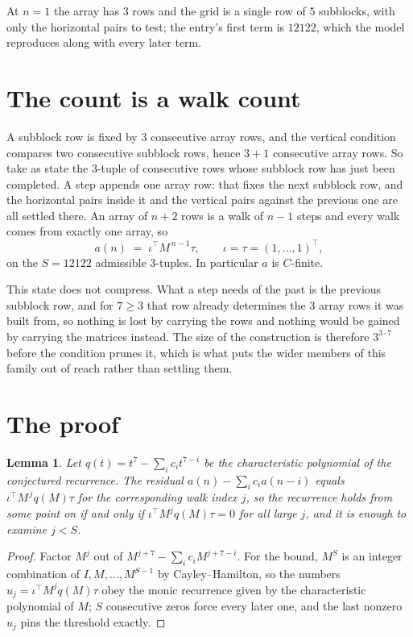 \documentclass[11pt,a4paper]{article}
\theoremstyle{plain}
\newtheorem{lemma}[theorem]{Lemma}
\theoremstyle{definition}
\begin{document}
At $n=1$ the array has $3$ rows and the grid is a single row of $5$
subblocks, with only the horizontal pairs to test; the entry's first term is
$12122$, which the model reproduces along with every later term.

\section{The count is a walk count}

A subblock row is fixed by $3$ consecutive array rows, and the vertical condition compares
two consecutive subblock rows, hence $3+1$ consecutive array rows. So take as state the
$3$-tuple of consecutive rows whose subblock row has just been completed. A step appends one
array row: that fixes the next subblock row, and the horizontal pairs inside it and the
vertical pairs against the previous one are all settled there. An array of $n+2$ rows is
a walk of $n-1$ steps and every walk comes from exactly one array, so
\[
a(n)\;=\;\iota^{\!\top}M^{\,n-1}\tau,\qquad\iota=\tau=(1,\dots,1)^{\!\top},
\]
on the $S=12122$ admissible $3$-tuples. In particular $a$ is $C$-finite.

This state does not compress. What a step needs of the past is the previous subblock row, and
for $7\ge3$ that row already determines the $3$ array rows it was built from, so nothing
is lost by carrying the rows and nothing would be gained by carrying the matrices instead. The
size of the construction is therefore $3^{3\cdot7}$ before the condition prunes
it, which is what puts the wider members of this family out of reach rather than settling them.

\section{The proof}

\begin{lemma}\label{lem:crit}
Let $q(t)=t^{7}-\sum_i c_it^{7-i}$ be the characteristic polynomial of the
conjectured recurrence. The residual $a(n)-\sum_ic_ia(n-i)$ equals
$\iota^{\!\top}M^{\,j}q(M)\tau$ for the corresponding walk index $j$, so the recurrence
holds from some point on if and only if $\iota^{\!\top}M^{j}q(M)\tau=0$ for all large $j$,
and it is enough to examine $j<S$.
\end{lemma}

\begin{proof}
Factor $M^{j}$ out of $M^{j+7}-\sum_ic_iM^{j+7-i}$. For the bound, $M^{S}$
is an integer combination of $I,M,\dots,M^{S-1}$ by Cayley--Hamilton, so the numbers
$u_j=\iota^{\!\top}M^{j}q(M)\tau$ obey the monic recurrence given by the characteristic
polynomial of $M$; $S$ consecutive zeros force every later one, and the last nonzero $u_j$
pins the threshold exactly.
\end{proof}
\end{document}
